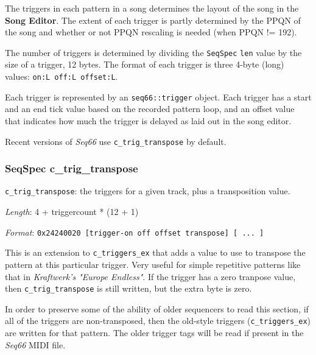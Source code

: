    The triggers in each pattern in a song determines the layout of the song in 
   the \textbf{Song Editor}.
   The extent of each trigger is partly determined by the PPQN of the song and
   whether or not PPQN rescaling is needed (when PPQN != 192).

   The number of triggers is determined by dividing the
   \texttt{SeqSpec} \texttt{len}
   value by the size of a trigger, 12 bytes.
   The format of each trigger is three 4-byte (long)
   values: \texttt{on:L off:L offset:L}.

   Each trigger is represented by an \texttt{seq66::trigger} object.
   Each trigger has a start and an end tick value based on the
   recorded pattern loop, and an offset value that indicates how much
   the trigger is delayed as laid out in the song editor.

   Recent versions of \textsl{Seq66} use \texttt{c\_trig\_transpose}
   by default.

\subsubsection{SeqSpec c\_trig\_transpose}
\label{subsubsec:midi_format_track_seqspec_trig_transpose}


   \begin{description}
      \item \texttt{c\_trig\_transpose}: the triggers for a given
         track, plus a transposition value.
      \item \textsl{Length}: 4 + triggercount * (12 + 1)
      \item \textsl{Format}: \texttt{0x24240020 [trigger-on off offset transpose]
         [ ... ]}
   \end{description}

   This is an extension to \texttt{c\_triggers\_ex} that adds a value to use to
   transpose the pattern at this particular trigger.
   Very useful for simple repetitive patterns like that in
   \textsl{Kraftwerk's "Europe Endless"}.
   If the trigger has a zero tranpose value, then 
   \texttt{c\_trig\_transpose} is still written, but the extra byte is zero.

   In order to preserve some of the ability of older sequencers to read this
   section, if all of the triggers are non-transposed, then the old-style
   triggers (\texttt{c\_triggers\_ex}) are written for that pattern.
   The older trigger tags will be read if
   present in the \textsl{Seq66} MIDI file.

